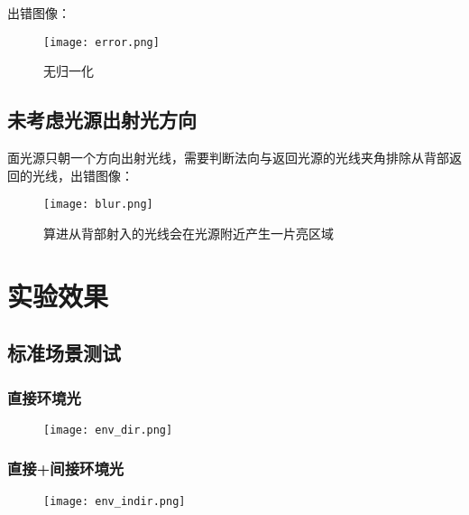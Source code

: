 \documentclass[14pt]{scrartcl} %
\begin{document}
出错图像：
\begin{figure}[h] %
	\centering
	\texttt{[image: error.png]} %
	\caption{无归一化}
\end{figure}

\subsection{未考虑光源出射光方向}

面光源只朝一个方向出射光线，需要判断法向与返回光源的光线夹角排除从背部返回的光线，出错图像：

\begin{figure}[h] %
	\centering
	\texttt{[image: blur.png]} %
	\caption{算进从背部射入的光线会在光源附近产生一片亮区域}
\end{figure}

\pagebreak

\section{实验效果}

\subsection{标准场景测试}

\subsubsection{直接环境光}

\begin{figure}[h] %
	\centering
	\texttt{[image: env\_dir.png]} %
\end{figure}

\subsubsection{直接+间接环境光}

\begin{figure}[h] %
	\centering
	\texttt{[image: env\_indir.png]} %
\end{figure}
\end{document}
